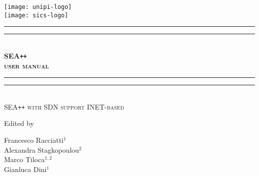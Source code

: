 
{
\centering
\texttt{[image: unipi-logo]}\\[2\baselineskip]
\texttt{[image: sics-logo]}\\[6\baselineskip]

\rule{\textwidth}{1.6pt}\vspace*{-\baselineskip}\vspace*{2pt}
\rule{\textwidth}{0.4pt}\\[\baselineskip]

{
\Large \bfseries SEA\texttt{++}\\[.25\baselineskip]
\scshape user manual\\[.25\baselineskip]
}

\rule{\textwidth}{0.4pt}\vspace*{-\baselineskip}\vspace{3.2pt}
\rule{\textwidth}{1.6pt}\\[\baselineskip] 

\scshape
SEA\texttt{++} with SDN support INET-based \\[\baselineskip] 
\par 
\vspace*{6\baselineskip}

Edited by \\[\baselineskip]
{Francesco Racciatti$^1$\\ Alexandra Stagkopoulou$^2$\\ Marco Tiloca$^{1,2}$\\ Gianluca Dini$^1$ \par}

}




